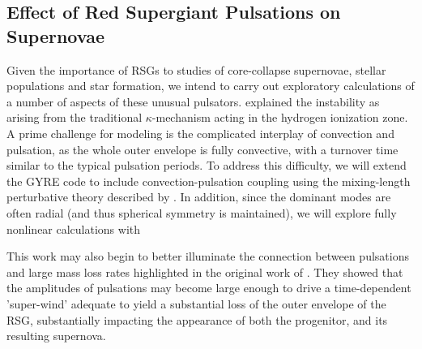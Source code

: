 \subsection{Effect of Red Supergiant Pulsations on Supernovae}

Given the importance of RSGs to studies of core-collapse supernovae, stellar populations and star formation, we intend to carry out exploratory calculations of a number of aspects of these unusual pulsators. 
\citet{1997AampA...327..224H}  explained the instability  as arising from the traditional $\kappa$-mechanism acting in the hydrogen ionization zone. A prime challenge for  modeling is the complicated interplay of convection and pulsation, as the whole outer envelope is fully convective, with a turnover time similar to the typical pulsation periods.   To address this difficulty, we will extend the GYRE code to include convection-pulsation coupling using the mixing-length perturbative theory described by \citet{Grigahcene:2005}. 
In addition, since the dominant modes are often radial (and thus spherical symmetry is maintained), we will explore fully nonlinear calculations with 

This work may also begin to better illuminate the connection between pulsations and large mass loss rates highlighted in the original work of \citet{Yoon_2010}. They showed that the amplitudes of pulsations may become large enough to drive a time-dependent 'super-wind' adequate to yield a substantial loss of the outer envelope of the RSG, substantially impacting the appearance of both the progenitor, and its resulting supernova.


